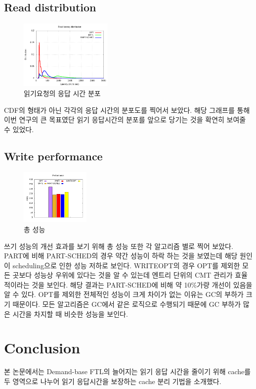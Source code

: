 \documentclass[conference]{IEEEtran}
\begin{document}
\subsection{Read distribution}
\begin{figure}[h]
	\centering
	\includegraphics[width=0.4\textwidth]{image/EVAL/dist.png}
	\caption{읽기요청의  응답 시간 분포}
	\label{fig:dist}
\end{figure}
CDF의 형태가 아닌 각각의 응답 시간의 분포도를 찍어서 보았다. 해당 그래프를 통해 이번 연구의 
큰 목표였단 읽기 응답시간의 분포를 앞으로 당기는 것을 확연히 보여줄 수 있었다.
\subsection{Write performance}
\begin{figure}[h]
	\centering
	\includegraphics[width=0.3\textwidth]{image/EVAL/through.png}
	\caption{총 성능}
	\label{fig:through}
\end{figure}
쓰기 성능의 개선 효과를 보기 위해 총 성능 또한 각 알고리즘 별로 찍어 보았다. PART에 비해 
PART-SCHED의 경우 약간 성능이 하락 하는 것을 보였는데 해당 원인이 scheduling으로 인한 성능 
저하로 보인다. WRITEOPT의 경우 OPT를 제외한 모든 곳보다 성능상 우위에 있다는 것을 알 수 있는데 
엔트리 단위의 CMT 관리가 효율적이라는 것을 보인다. 해당 결과는 PART-SCHED에 비해 약 10\%가량 개선이 
있음을 알 수 있다. OPT를 제외한 전체적인 성능이 크게 차이가 없는 이유는 GC의 부하가 크기 때문이다. 
모든 알고리즘은 GC에서 같은 로직으로 수행되기 때문에 GC 부하가 많은 시간을 차지할 때 비슷한 성능을 보인다. 

\section{Conclusion}
본 논문에서는 Demand-base FTL의 늘어지는 읽기 응답 시간을 줄이기 위해 cache를 두 영역으로 나누어 
읽기 응답시간을 보장하는 cache 분리 기법을 소개했다. \par
\end{document}
